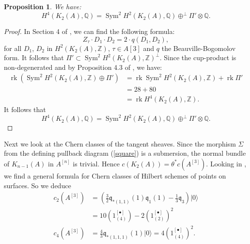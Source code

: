 \documentclass{amsart}
\DeclareMathOperator{\Sym}{Sym}
\DeclareMathOperator{\rk}{rk}
\newcommand{\hilb}[1]{^{[#1]}}
\newcommand{\vac}{|0\rangle}
\newcommand{\kum}[2]{K_{ #2 }( #1 )}
\newcommand{\Q}{\mathbb{Q}}
\newcommand{\Z}{\mathbb{Z}}
\theoremstyle{plain}
\newtheorem{proposition}[theorem]{Proposition}
\theoremstyle{definition}
\theoremstyle{remark}
\begin{document}
\begin{proposition}\label{Pi'}
We have:
$$H^{4}(K_{2}(A),\Q)=\Sym^2 H^{2}(K_{2}(A),\Q)\oplus^{\bot} \Pi'\otimes\Q.$$
\end{proposition}
\begin{proof}
In Section 4 of \cite{HassettTschinkel}, we can find the following formula:
\begin{equation}
Z_{\tau}\cdot D_{1}\cdot D_{2}=2\cdot q(D_{1},D_{2}),
\label{ZT}
\end{equation}
for all $D_{1}$, $D_{2}$ in $H^{2}(K_{2}(A),\Z)$, $\tau\in A[3]$ and $q$ the Beauville-Bogomolov form.
It follows that $\Pi'\subset \Sym^2 H^{2}(K_{2}(A),\Z)^{\bot}$.
Since the cup-product is non-degenerated and by Proposition 4.3 of \cite{HassettTschinkel}, 
we have: 
\begin{align*}
\rk \left(\Sym^2 H^{2}(K_{2}(A),\Z) \oplus\Pi'\right)&=\rk \Sym^2 H^{2}(K_{2}(A),\Z) + \rk\Pi'\\
&=28+80\\
&= \rk H^{4}(K_{2}(A),\Z).
\end{align*}
It follows that $$H^{4}(K_{2}(A),\Q)=\Sym^2 H^{2}(K_{2}(A),\Q)\oplus^{\bot} \Pi'\otimes\Q.$$
\end{proof}

Next we look at the Chern classes of the tangent sheaves. Since the morphism $\Sigma$ from the defining pullback diagram (\ref{square}) is a submersion, the normal bundle of $\kum{A}{n-1}$ in $A\hilb{n}$ is trivial. Hence $c(\kum{A}{2}) = \theta^* c(A\hilb{3})$. Looking in \cite[Sect.~8]{Generating}, we find a general formula for Chern classes of Hilbert schemes of points on surfaces. So we deduce
\begin{align*}
c_2(A\hilb{3}) &= \left(\tfrac{3}{2} \mathfrak{q}_{*(1,1)}(1) \mathfrak{q}_1(1) -\tfrac{1}{3} \mathfrak{q}_3\right)\vac \\
 &= 10(1\hilb{\bullet}_{(4)})  -2(1\hilb{\bullet}_{(2)})^2 \\
c_4(A\hilb{3}) &= \tfrac{4}{3} \mathfrak{q}_{*(1,1,1)}( 1)\vac = 4 (1\hilb{\bullet}_{(4)})^2. 
\end{align*}
\end{document}
